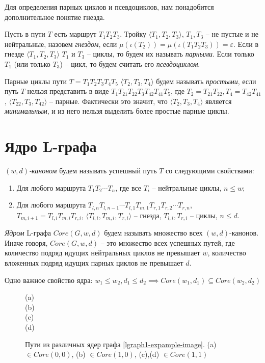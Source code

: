 Для определения парных циклов и псевдоциклов, нам понадобится дополнительное понятие гнезда.

Пусть в пути $T$ есть маршрут $T_1 T_2 T_3$. 
Тройку $\langle T_1, T_2, T_3 \rangle$, $T_1, T_3$ -- не пустые и не нейтральные, назовем \emph{гнездом}, 
если $\mu(\iota(T_2)) = \mu(\iota(T_1 T_2 T_3)) = \varepsilon$.
Если в гнезде $\langle T_1, T_2, T_3 \rangle$ $T_1$ и $T_3$ -- циклы, то будем их называть \emph{парными}.
Если только $T_1$ (или только $T_3$) -- цикл, то будем считать его \emph{псевдоциклом}.

Парные циклы пути $T = T_1 T_2 T_3 T_4 T_5$ $\langle T_2, T_3, T_4 \rangle$ будем называть \emph{простыми}, если
путь $T$ нельзя представить в виде $T_1 T_{21} T_{22} T_3 T_{42} T_{41} T_5$, где $T_2 = T_{21} T_{22}, T_4 = T_{42} T_{41}$,
$\langle T_{22}, T_3, T_{42} \rangle$ -- парные. Фактически это значит, что $\langle T_2, T_3, T_4\rangle$ является
\emph{минимальным}, и из него нельзя выделить более простые парные циклы.

\section{Ядро L-графа}

\emph{$(w,d)$-каноном} будем называть успешный путь $T$ со следующими свойствами:
\begin{enumerate}[label=\arabic*)]
    \item Для любого маршрута $T_1 T_2 \cdots T_n$, где все $T_i$ -- нейтральные циклы, $n \leq w$;
    \item Для любого маршрута $T_{l,n} T_{l,n-1} \cdots T_{l,1} T_{m,1} T_{r,1} T_{r,2} \cdots T_{r,n}$,\\
       $T_{m,i+1} = T_{l,i} T_{m,i} T_{r,i}$, $\langle T_{l,i}, T_{m,i}, T_{r,i} \rangle$ -- гнезда, $T_{l,i}, T_{r,i}$ -- циклы,
       $n \leq d$.
\end{enumerate}

\emph{Ядром} L-графа $Core(G, w, d)$ будем называть множество всех $(w,d)$-канонов. 
Иначе говоря, $Core(G, w, d)$ -- это множество всех успешных путей, 
где количество подряд идущих нейтральных циклов не превышает $w$, 
количество вложенных подряд идущих парных циклов не превышает $d$.  

Одно важное свойство ядра: $w_1 \leq w_2, d_1 \leq d_2 \implies Core(w_1, d_1) \subseteq Core(w_2, d_2)$

\begin{figure}[h]
    \centering
     (a)\\
     (b)\\
     (c)\\
     (d)\\
    
    \caption{Пути из различных ядер графа \ref{lgraph1-expample-image}. (a) $\in Core(0,0)$, (b) $\in Core(1,0)$, (c),(d) $\in Core(1,1)$}
    \label{lgraph1-core-example}
\end{figure}

